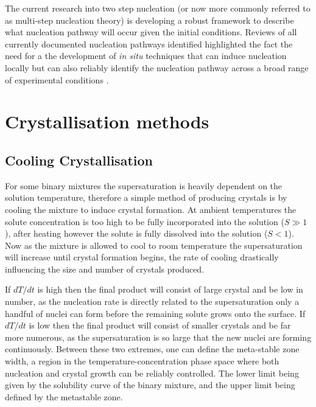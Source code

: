 The current research into two step nucleation (or now more commonly referred 
to as multi-step nucleation theory) is developing a robust framework to 
describe what nucleation pathway will occur given the initial conditions. 
Reviews of all currently documented nucleation pathways identified highlighted 
the fact the need for a the development of \textit{in situ} techniques that 
can induce nucleation locally but can also reliably identify the nucleation 
pathway across a broad range of experimental conditions \cite{Karthika2016, Fu2021}. 

\section{Crystallisation methods}
\subsection{Cooling Crystallisation}
For some binary mixtures the supersaturation is heavily dependent on 
the solution temperature, therefore a simple method of producing crystals 
is by cooling the mixture to induce crystal formation. At ambient 
temperatures the solute concentration is too high to be fully incorporated
into the solution ($S\gg 1$), after heating however the solute is fully 
dissolved into the solution ($S<1$). Now as the mixture is allowed to cool 
to room temperature the supersaturation will increase until crystal formation begins, the rate of cooling drastically influencing the size and number of crystals produced.

If $dT/dt$ is high then the final product will consist of large 
crystal and be low in number, as the nucleation rate is directly related
to the supersaturation only a handful of nuclei can form before the remaining
solute grows onto the surface. If $dT/dt$ is low then the final product will 
consist of smaller crystals and be far more numerous, as the supersaturation 
is so large that the new nuclei are forming continuously. Between these two 
extremes, one can define the meta-stable zone width, a region in the 
temperature-concentration phase space where both nucleation and crystal growth
can be reliably controlled. The lower limit being given by the solubility curve
of the binary mixture, and the upper limit being defined by the metastable zone.

